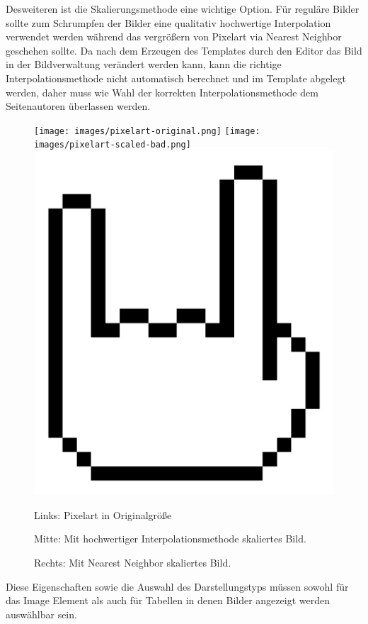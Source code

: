 Desweiteren ist die Skalierungsmethode eine wichtige Option. Für reguläre Bilder
sollte zum Schrumpfen der Bilder eine qualitativ hochwertige Interpolation
verwendet werden während das vergrößern von Pixelart via Nearest Neighbor
geschehen sollte. Da nach dem Erzeugen des Templates durch den Editor das Bild
in der Bildverwaltung verändert werden kann, kann die richtige
Interpolationsmethode nicht automatisch berechnet und im Template abgelegt
werden, daher muss wie Wahl der korrekten Interpolationsmethode dem
Seitenautoren überlassen werden.

\begin{figure}
  \texttt{[image: images/pixelart-original.png]}
  \texttt{[image: images/pixelart-scaled-bad.png]}
  \includegraphics[width=\columnwidth/100*46]{images/pixelart-scaled-good.png}

  Links: Pixelart in Originalgröße

  Mitte: Mit hochwertiger Interpolationsmethode skaliertes Bild.

  Rechts: Mit Nearest Neighbor skaliertes Bild.
\end{figure}

Diese Eigenschaften sowie die Auswahl des Darstellungstyps müssen sowohl für das
Image Element als auch für Tabellen in denen Bilder angezeigt werden auswählbar
sein.

